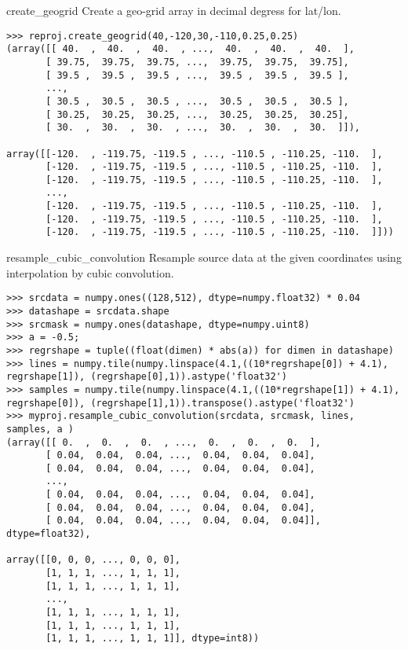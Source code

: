 \documentclass{howto}
\begin{document}
\begin{methoddesc}{create_geogrid}{}
    Create a geo-grid array in decimal degress for lat/lon.

\begin{verbatim}
>>> reproj.create_geogrid(40,-120,30,-110,0.25,0.25)
(array([[ 40.  ,  40.  ,  40.  , ...,  40.  ,  40.  ,  40.  ],
       [ 39.75,  39.75,  39.75, ...,  39.75,  39.75,  39.75],
       [ 39.5 ,  39.5 ,  39.5 , ...,  39.5 ,  39.5 ,  39.5 ],
       ...,
       [ 30.5 ,  30.5 ,  30.5 , ...,  30.5 ,  30.5 ,  30.5 ],
       [ 30.25,  30.25,  30.25, ...,  30.25,  30.25,  30.25],
       [ 30.  ,  30.  ,  30.  , ...,  30.  ,  30.  ,  30.  ]]), 
       
array([[-120.  , -119.75, -119.5 , ..., -110.5 , -110.25, -110.  ],
       [-120.  , -119.75, -119.5 , ..., -110.5 , -110.25, -110.  ],
       [-120.  , -119.75, -119.5 , ..., -110.5 , -110.25, -110.  ],
       ...,
       [-120.  , -119.75, -119.5 , ..., -110.5 , -110.25, -110.  ],
       [-120.  , -119.75, -119.5 , ..., -110.5 , -110.25, -110.  ],
       [-120.  , -119.75, -119.5 , ..., -110.5 , -110.25, -110.  ]]))
\end{verbatim}
\end{methoddesc}

\begin{methoddesc}{resample_cubic_convolution}{}
  Resample source data at the given coordinates using interpolation by cubic convolution.

\begin{verbatim}
>>> srcdata = numpy.ones((128,512), dtype=numpy.float32) * 0.04
>>> datashape = srcdata.shape
>>> srcmask = numpy.ones(datashape, dtype=numpy.uint8)
>>> a = -0.5;
>>> regrshape = tuple((float(dimen) * abs(a)) for dimen in datashape)
>>> lines = numpy.tile(numpy.linspace(4.1,((10*regrshape[0]) + 4.1), regrshape[1]), (regrshape[0],1)).astype('float32')
>>> samples = numpy.tile(numpy.linspace(4.1,((10*regrshape[1]) + 4.1), regrshape[0]), (regrshape[1],1)).transpose().astype('float32')
>>> myproj.resample_cubic_convolution(srcdata, srcmask, lines, samples, a )
(array([[ 0.  ,  0.  ,  0.  , ...,  0.  ,  0.  ,  0.  ],
       [ 0.04,  0.04,  0.04, ...,  0.04,  0.04,  0.04],
       [ 0.04,  0.04,  0.04, ...,  0.04,  0.04,  0.04],
       ...,
       [ 0.04,  0.04,  0.04, ...,  0.04,  0.04,  0.04],
       [ 0.04,  0.04,  0.04, ...,  0.04,  0.04,  0.04],
       [ 0.04,  0.04,  0.04, ...,  0.04,  0.04,  0.04]], dtype=float32),
       
array([[0, 0, 0, ..., 0, 0, 0],
       [1, 1, 1, ..., 1, 1, 1],
       [1, 1, 1, ..., 1, 1, 1],
       ...,
       [1, 1, 1, ..., 1, 1, 1],
       [1, 1, 1, ..., 1, 1, 1],
       [1, 1, 1, ..., 1, 1, 1]], dtype=int8))
\end{verbatim}
\end{methoddesc}
\end{document}
